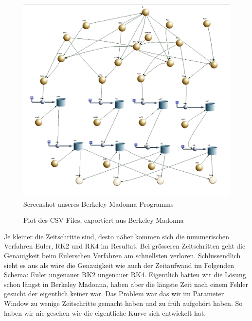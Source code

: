\documentclass{article}
\begin{document}
	\begin{figure}[h!]
			\caption{Screenshot unseres Berkeley Madonna Programms}
		    \centering
			\includegraphics[width=1\textwidth]{madonna_screen}
	\end{figure}


	\begin{figure}
		\caption{Plot des CSV Files, exportiert aus Berkeley Madonna}
	\end{figure}

	Je kleiner die Zeitschritte sind, desto näher kommen sich die nummerischen Verfahren Euler, RK2 und RK4 im Resultat. Bei grösseren Zeitschritten geht die Genauigkeit beim Eulerschen Verfahren am schnellsten verloren. Schlussendlich sieht es aus als wäre die Genauigkeit wie auch der Zeitaufwand im Folgenden Schema: Euler ungenauer RK2 ungenauer RK4.
	Eigentlich hatten wir die Lösung schon längst in Berkeley Madonna, haben aber die längste Zeit nach einem Fehler gesucht der eigentlich keiner war. Das Problem war das wir im Parameter Window zu wenige Zeitschritte gemacht haben und zu früh aufgehört haben. So haben wir nie gesehen wie die eigentliche Kurve sich entwickelt hat.
\end{document}
